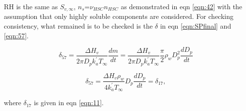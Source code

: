 \documentclass[12pt]{amsart}
\begin{document}
RH is the same as $S_{v, \infty}$, $n_{s}$=$\nu_{HSC}$$n_{HSC}$ as demonstrated in eqn \ref{eqn:42} with the assumption that only highly soluble components are considered. For checking consistency, what remained is to be checked is the $\delta$ in eqn \ref{eqn:SPfinal} and \ref{eqn:57}. 


\begin{equation}
\delta_{57}=\frac{\Delta H_{v}}{2 \pi D_{p} k^{'}_{a} T_{\infty}} \frac{dm}{dt}
=\frac{\Delta H_{v}}{2 \pi D_{p} k^{'}_{a} T_{\infty}} \frac{\pi}{2}\rho_wD_{p}^{2}\frac{dD_{p}}{dt}
\end{equation}


\begin{equation}
\delta_{57}=\frac{\Delta H_{v} \rho_{w}}{4 k^{'}_{a} T_{\infty}} D_{p}\frac{dD_{p}}{dt}=\delta_{17},
\end{equation}

where $\delta_{17}$ is given in eqn \ref{eqn:11}.
\end{document}
